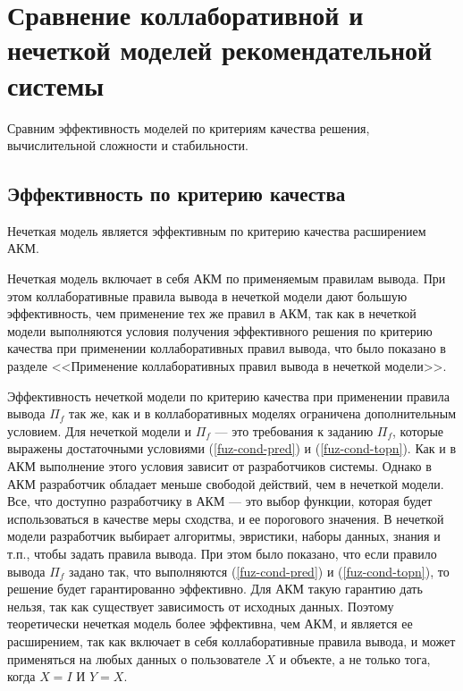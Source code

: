 
\section{Сравнение коллаборативной и нечеткой моделей рекомендательной системы}
Сравним эффективность моделей по критериям качества решения, вычислительной
сложности и стабильности.
\subsection{Эффективность по критерию качества}
\begin{trm}
	\label{trm:fuz-eff-extension}
	Нечеткая модель является эффективным по критерию качества расширением АКМ.
\end{trm}
Нечеткая модель включает в себя АКМ по применяемым правилам вывода.
При этом коллаборативные правила вывода в нечеткой модели дают большую
эффективность, чем применение тех же правил в АКМ, так как в нечеткой
модели выполняются условия получения эффективного решения по критерию качества
при применении коллаборативных правил вывода, что было показано в разделе
<<Применение коллаборативных правил вывода в нечеткой модели>>.

Эффективность нечеткой модели по критерию качества при применении правила
вывода $\Pi_f$ так же, как и в коллаборативных моделях ограничена
дополнительным условием. Для нечеткой модели и $\Pi_f$ --- это требования
к заданию $\Pi_f$, которые выражены достаточными условиями
(\ref{fuz-cond-pred}) и (\ref{fuz-cond-topn}). Как и в АКМ выполнение этого условия
зависит от разработчиков системы. Однако в АКМ разработчик
обладает меньше свободой действий, чем в нечеткой модели. Все, что доступно
разработчику в АКМ --- это выбор функции, которая будет
использоваться в качестве меры сходства, и ее порогового значения. В нечеткой
модели разработчик выбирает алгоритмы, эвристики, наборы данных, знания и т.п.,
чтобы задать правила вывода. При этом было показано, что если правило вывода
$\Pi_f$ задано так, что выполняются (\ref{fuz-cond-pred}) и
(\ref{fuz-cond-topn}), то решение будет гарантированно эффективно.
Для АКМ такую гарантию дать нельзя, так как существует зависимость от исходных
данных. Поэтому теоретически нечеткая модель более
эффективна, чем АКМ, и является ее расширением, так как включает
в себя коллаборативные правила вывода, и может применяться на любых данных
о пользователе $X$ и объекте, а не только тога, когда $X = I$ И $Y = X$.

